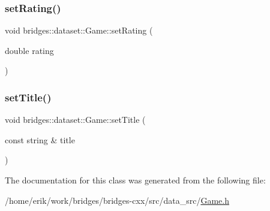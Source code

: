\subsubsection{\texorpdfstring{set\+Rating()}{setRating()}}
{\footnotesize\ttfamily void bridges\+::dataset\+::\+Game\+::set\+Rating (\begin{DoxyParamCaption}\item[{double}]{rating }\end{DoxyParamCaption})\hspace{0.3cm}{\ttfamily [inline]}}

\mbox{\label{classbridges_1_1dataset_1_1_game_a8f8f6e03458c05e20b0b446f9ddd211a}} 
\subsubsection{\texorpdfstring{set\+Title()}{setTitle()}}
{\footnotesize\ttfamily void bridges\+::dataset\+::\+Game\+::set\+Title (\begin{DoxyParamCaption}\item[{const string \&}]{title }\end{DoxyParamCaption})\hspace{0.3cm}{\ttfamily [inline]}}



The documentation for this class was generated from the following file\+:\begin{DoxyCompactItemize}
\item 
/home/erik/work/bridges/bridges-\/cxx/src/data\+\_\+src/\hyperlink{_game_8h}{Game.\+h}\end{DoxyCompactItemize}
